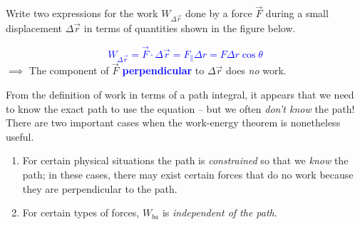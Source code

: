 \documentclass[11pt, letterpaper, openany]{book}
\newenvironment{exercise}[1][Exercise]{%
  \tcolorbox[blanker, breakable, left=1em,
    before skip=1em, after skip=1em,
    borderline west={3pt}{0pt}{PhysNavy},
    colback=PhysCream,
    before upper={\textcolor{PhysNavy}{\sffamily\bfseries #1:}\space}
  ]%
}{%
  \endtcolorbox%
}
\begin{document}
\begin{exercise}[Exercise 2]
Write two expressions for the work $W_{\Delta\vec{r}}$ done by a force $\vec{F}$ during a small displacement $\Delta\vec{r}$ in terms of quantities shown in the figure below.
\begin{center}
\end{center}
\textcolor{blue}{\[ W_{\Delta\vec{r}} = \vec{F} \cdot \Delta\vec{r} = F_{\parallel}\Delta r = F\Delta r\cos\theta \]}
$\implies$ The component of $\vec{F}$ \textbf{\textcolor{blue}{perpendicular}} to $\Delta\vec{r}$ does \textit{no} work.
\end{exercise}

From the definition of work in terms of a path integral, it appears that we need to know the exact path to use the equation -- but we often \textit{don't know} the path! There are two important cases when the work-energy theorem is nonetheless useful.
\begin{enumerate}
    \item For certain physical situations the path is \textit{constrained} so that we \textit{know} the path; in these cases, there may exist certain forces that do no work because they are perpendicular to the path.
    \item For certain types of forces, $W_{ba}$ is \textit{independent of the path}.
\end{enumerate}
\end{document}
